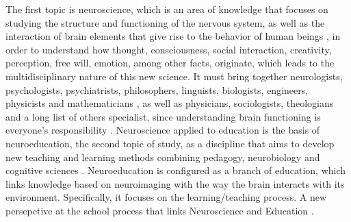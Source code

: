\documentclass[english]{textolivre}
\begin{document}
The first topic is neuroscience, which is an area of knowledge that focuses on studying the structure and functioning of the nervous system, as well as the interaction of brain elements that give rise to the behavior of human beings \cite{blakemore_como_2007,manes_usar_2014}, in order to understand how thought, consciousness, social interaction, creativity, perception, free will, emotion, among other facts, originate, which leads to the multidisciplinary nature of this new science. It must bring together neurologists, psychologists, psychiatrists, philosophers, linguists, biologists, engineers, physicists and mathematicians \cite{manes_usar_2014}, as well as physicians, sociologists, theologians and a long list of others specialist, since understanding brain functioning is everyone's responsibility \cite{cumpa_valencia_usos_2019}. Neuroscience applied to education is the basis of neuroeducation, the second topic of study, as a discipline that aims to develop new teaching and learning methods combining pedagogy, neurobiology and cognitive sciences \cite{manes_usar_2014}. Neuroeducation is configured as a branch of education, which links knowledge based on neuroimaging with the way the brain interacts with its environment. Specifically, it focuses on the learning/teaching process. A new persepctive at the school process that links Neuroscience and Education \cite{bejar_neuroeducacion_2014}.
\end{document}
